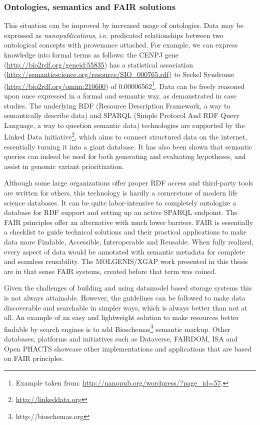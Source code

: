 \subsubsection*{Ontologies, semantics and FAIR solutions}

This situation can be improved by increased usage of ontologies.
Data may be expressed as \textsl{nanopublications}, i.e. predicated relationships between two ontological concepts with provenance attached.
For example, we can express knowledge into formal terms as follows:
the CENPJ gene (\url{http://bio2rdf.org/geneid:55835}) has a statistical association (\url{http://semanticscience.org/resource/SIO_000765.rdf}) to Seckel Syndrome (\url{http://bio2rdf.org/omim:210600}) of 0.00006562\footnote{Example taken from: \url{http://nanopub.org/wordpress/?page_id=57}.}.
Data can be freely reasoned upon once expressed in a formal and semantic way, as demonstrated in case studies\cite{Mina2015}.
The underlying RDF\cite{RDF-PRIMER} (Resource Description Framework, a way to semantically describe data) and SPARQL\cite{Prudhommeaux08} (Simple Protocol And RDF Query Language, a way to question semantic data) technologies are supported by the Linked Data initiative\footnote{\url{http://linkeddata.org}}, which aims to connect structured data on the internet, essentially turning it into a giant database.
It has also been shown that semantic queries can indeed be used for both generating and evaluating hypotheses\cite{Mina2015,Callahan_2011}, and assist in genomic variant prioritization\cite{Boudellioua_2017}.

Although some large organizations offer proper RDF access\cite{Jupp_2014} and third-party tools are written for others\cite{Anguita_2013}, this technology is hardly a cornerstone of modern life science databases.
It can be quite labor-intensive to completely ontologize a database for RDF support and setting up an active SPARQL endpoint.
The FAIR principles\cite{Wilkinson_2016,Wilkinson_2017} offer an alternative with much lower barriers.
FAIR is essentially a checklist to guide technical solutions and their practical applications to make data more Findable, Accessible, Interoperable and Reusable.
When fully realized, every aspect of data would be annotated with semantic metadata for complete and seamless reusability.
The MOLGENIS/XGAP work presented in this thesis are in that sense FAIR systems, created before that term was coined.

Given the challenges of building and using datamodel based storage systems this is not always attainable.
However, the guidelines can be followed to make data discoverable and searchable in simpler ways, which is always better than not at all.
An example of an easy and lightweight solution to make resources better findable by search engines is to add Bioschemas\footnote{http://bioschemas.org} semantic markup.
Other databases, platforms and initiatives such as Dataverse\cite{Crosas_2016}, FAIRDOM\cite{Wolstencroft_2016}, ISA\cite{Sansone_2012} and Open PHACTS\cite{Harland_2012} showcase other implementations and applications that are based on FAIR principles.


